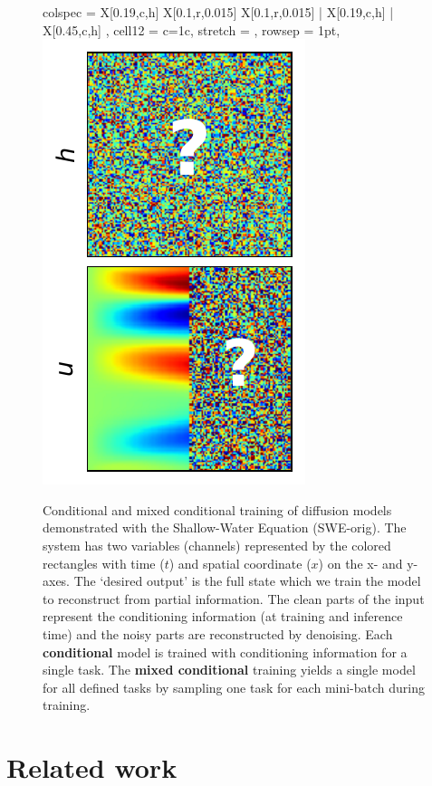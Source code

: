 \documentclass{article}
\begin{document}
\begin{figure}[t]
\begin{tblr}{
  colspec = {X[0.19,c,h] X[0.1,r,0.015] X[0.1,r,0.015] | X[0.19,c,h] | X[0.45,c,h] },
  cell{1}{2} = {c=1}{c}, %
  stretch = ,
  rowsep = 1pt,
}
     \hspace{1mm}
     \includegraphics[height=\myheight,trim={8mm 2mm 2mm 2mm},clip]{img/diff_cases/case5_inf.pdf}

\end{tblr}
\caption{Conditional and mixed conditional training of diffusion models demonstrated with the Shallow-Water Equation (SWE-orig). The system has two variables (channels) represented by the colored rectangles with time ($t$) and spatial coordinate ($x$) on the x- and y-axes. The `desired output' is the full state which we train the model to reconstruct from partial information. The clean parts of the input represent the conditioning information (at training and inference time) and the noisy parts are reconstructed by denoising.
Each \textbf{conditional} model is trained with conditioning information for a single task. %
The \textbf{mixed conditional} training yields a single model for all defined tasks by sampling one task for each mini-batch during training.
}
\label{f:method_overview}
\end{figure}

        




\section{Related work}
\label{sec:related_work}
\end{document}
